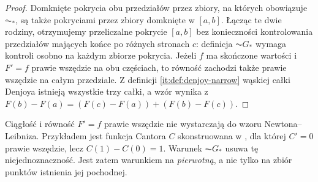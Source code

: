 \begin{proof}
Domknięte pokrycia obu przedziałów przez zbiory, na których obowiązuje $\AC_*$, są także pokryciami przez zbiory domknięte w $[a,b]$. Łącząc te dwie rodziny, otrzymujemy przeliczalne pokrycie $[a,b]$ bez konieczności kontrolowania przedziałów mających końce po różnych stronach $c$: definicja $\AC G_*$ wymaga kontroli osobno na każdym zbiorze pokrycia. Jeżeli $f$ ma skończone wartości i $F'=f$ prawie wszędzie na obu częściach, to równość zachodzi także prawie wszędzie na całym przedziale. Z definicji \ref{it:def:denjoy-narrow} wąskiej całki Denjoya istnieją wszystkie trzy całki, a wzór wynika z $F(b)-F(a)=(F(c)-F(a))+(F(b)-F(c))$.
\end{proof}
\begin{uwaga}
Ciągłość i równość $F'=f$ prawie wszędzie nie wystarczają do wzoru Newtona--Leibniza. Przykładem jest funkcja Cantora $C$ skonstruowana w , dla której $C'=0$ prawie wszędzie, lecz $C(1)-C(0)=1$. Warunek $\AC G_*$ usuwa tę niejednoznaczność. Jest zatem warunkiem na \emph{pierwotną}, a nie tylko na zbiór punktów istnienia jej pochodnej.
\end{uwaga}

